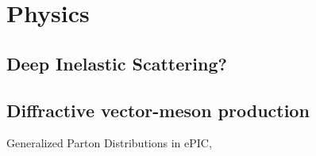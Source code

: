 \chapter{Physics}\label{cha:physics} %

\section{Deep Inelastic Scattering?}

\section{Diffractive vector-meson production}
Generalized Parton Distributions in ePIC, 

